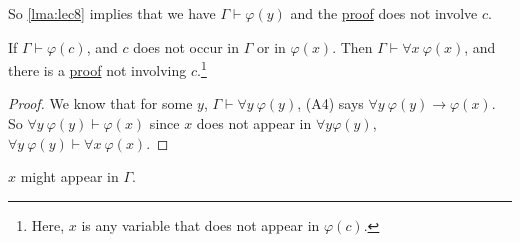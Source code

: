 So \autoref{lma:lec8} implies that we have \(\Gamma \vdash \varphi (y)\) and the \hyperref[def:proof]{proof} does not involve \(c\).

\begin{corollary}\label{col:lec8}
	If \(\Gamma \vdash \varphi (c)\), and \(c\) does not occur in \(\Gamma \) or in \(\varphi (x)\). Then \(\Gamma \vdash \forall x\ \varphi (x)\), and there is a \hyperref[def:proof]{proof} not involving \(c\).\footnote{Here, \(x\) is any variable that does not appear in \(\varphi  (c)\).}
\end{corollary}
\begin{proof}
	We know that for some \(y\), \(\Gamma \vdash \forall y\ \varphi (y)\), (A4) says \(\forall y\ \varphi (y) \to  \varphi (x)\). So \(\forall y\ \varphi (y) \vdash \varphi (x)\) since \(x\) does not appear in \(\forall y \varphi (y)\), \(\forall y\ \varphi (y) \vdash \forall x\ \varphi (x)\).
\end{proof}

\begin{note}
	\(x\) might appear in \(\Gamma \).
\end{note}

